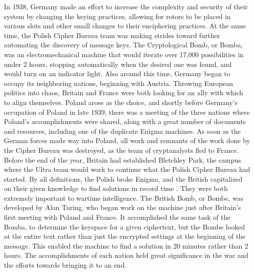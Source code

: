 In 1938, Germany made an effort to increase the complexity and security of their system by changing the keying practices, allowing for rotors to be placed in various slots and other small changes to their enciphering practices. At the same time, the Polish Cipher Bureau team was making strides toward further automating the discovery of message keys. The Cryptological Bomb, or Bomba, was an electromechanical machine that would iterate over 17,000 possibilities in under 2 hours, stopping automatically when the desired one was found, and would turn on an indicator light. Also around this time, Germany began to occupy its neighboring nations, beginning with Austria. Throwing European politics into chaos, Britain and France were both looking for an ally with which to align themselves. Poland arose as the choice, and shortly before Germany’s occupation of Poland in late 1939, there was a meeting of the three nations where Poland’s accomplishments were shared, along with a great number of documents and resources, including one of the duplicate Enigma machines. As soon as the German forces made way into Poland, all work and remnants of the work done by the Cipher Bureau was destroyed, as the team of cryptanalysts fled to France. Before the end of the year, Britain had established Bletchley Park, the campus where the Ultra team would work to continue what the Polish Cipher Bureau had started. By all definitions, the Polish broke Enigma, and the British capitalized on their given knowledge to find solutions in record time \cite{rfc01}. They were both extremely important to wartime intelligence. The British Bomb, or Bombe, was developed by Alan Turing, who began work on the machine just after Britain’s first meeting with Poland and France. It accomplished the same task of the Bomba, to determine the keyspace for a given ciphertext, but the Bombe looked at the entire text rather than just the encrypted settings at the beginning of the message. This enabled the machine to find a solution in 20 minutes rather than 2 hours. The accomplishments of each nation held great significance in the war and the efforts towards bringing it to an end.

